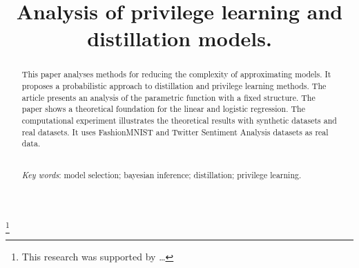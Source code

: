 \documentclass[12pt]{a&t}
\begin{document}

\title{Analysis of privilege learning and distillation models.}%
\thanks{This research was supported by \dots}


\maketitle

\begin{abstract}
This paper analyses methods for reducing the complexity of approximating models. It proposes a probabilistic approach to distillation and privilege learning methods. The article presents an analysis of the parametric function with a fixed structure. The paper shows a theoretical foundation for the linear and logistic regression. The computational experiment illustrates the theoretical results with synthetic datasets and real datasets. It uses FashionMNIST and Twitter Sentiment Analysis datasets as real data.

\smallskip\\
\textit{Key words}: model selection; bayesian inference; distillation; privilege learning.
\end{abstract}


\end{document}
